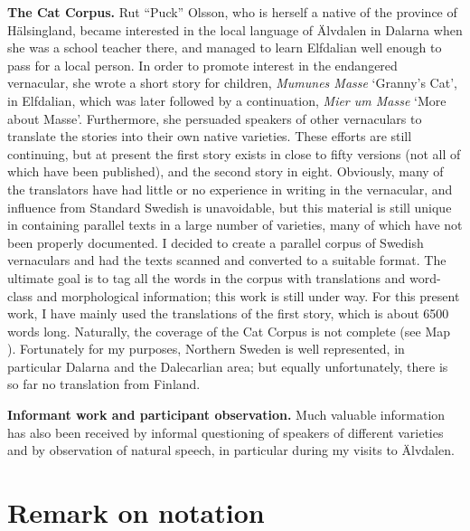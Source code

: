 \begin{styleBodytextC}
\textbf{The Cat Corpus. }Rut “Puck” Olsson, who is herself a native of the province of Hälsingland, became interested in the local language of Älvdalen in Dalarna when she was a school teacher there, and managed to learn Elfdalian well enough to pass for a local person. In order to promote interest in the endangered vernacular, she wrote a short story for children, \textit{Mumunes Masse} ‘Granny’s Cat’, in Elfdalian, which was later followed by a continuation, \textit{Mier um Masse} ‘More about Masse’. Furthermore, she persuaded speakers of other vernaculars to translate the stories into their own native varieties. These efforts are still continuing, but at present the first story exists in close to fifty versions (not all of which have been published), and the second story in eight. Obviously, many of the translators have had little or no experience in writing in the vernacular, and influence from Standard Swedish is unavoidable, but this material is still unique in containing parallel texts in a large number of varieties, many of which have not been properly documented. I decided to create a parallel corpus of Swedish vernaculars and had the texts scanned and converted to a suitable format. The ultimate goal is to tag all the words in the corpus with translations and word-class and morphological information; this work is still under way. For this present work, I have mainly used the translations of the first story, which is about 6500 words long. Naturally, the coverage of the Cat Corpus is not complete (see Map ). Fortunately for my purposes, Northern Sweden is well represented, in particular Dalarna and the Dalecarlian area; but equally unfortunately, there is so far no translation from Finland. 

\end{styleBodytextC}

\begin{styleBodytextC}
\textbf{Informant work and participant observation. }Much\textbf{ }valuable information has also been received by informal questioning of speakers of different varieties and by observation of natural speech, in particular during my visits to Älvdalen. 

\end{styleBodytextC}

\section{\rmfamily\bfseries Remark on notation}

